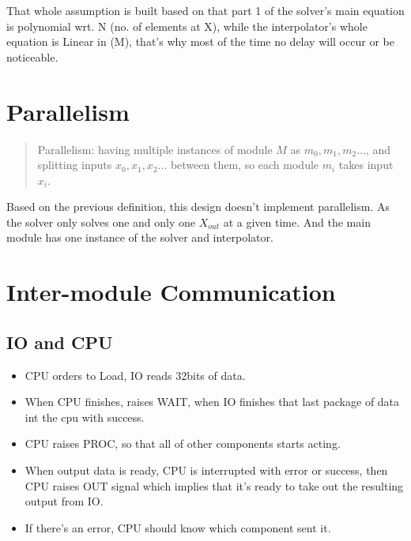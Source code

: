 \documentclass[12pt]{report}
\begin{document}
That whole assumption is built based on that part 1 of the solver's main equation is polynomial wrt. N (no. of elements at X), while the interpolator's whole equation is Linear in (M), that's why most of the time no delay will occur or be noticeable.

\section{Parallelism}
\label{sec:parallel}
\begin{verse}
    Parallelism: having multiple instances of module $M$ as $m_0, m_1, m_2 \dots$, and splitting inputs $x_0, x_1, x_2 \dots$ between them, so each module $m_i$ takes input $x_i$.
\end{verse}
Based on the previous definition, this design doesn't implement parallelism. As the solver only solves one and only one $X_{out}$ at a given time. And the main module has one instance of the solver and interpolator.


\section{Inter-module Communication}

\subsection{IO and CPU}
\begin{itemize}
    \item CPU orders to Load, IO reads 32bits of data.
    \item When CPU finishes, raises WAIT, when IO finishes that last package of data int the cpu with success.
    \item CPU raises PROC, so that all of other components starts acting.
    \item When output data is ready, CPU is interrupted with error or success, then CPU raises OUT signal which implies that it's ready to take out the resulting output from IO.
    \item If there's an error, CPU should know which component sent it.
\end{itemize}
\end{document}
